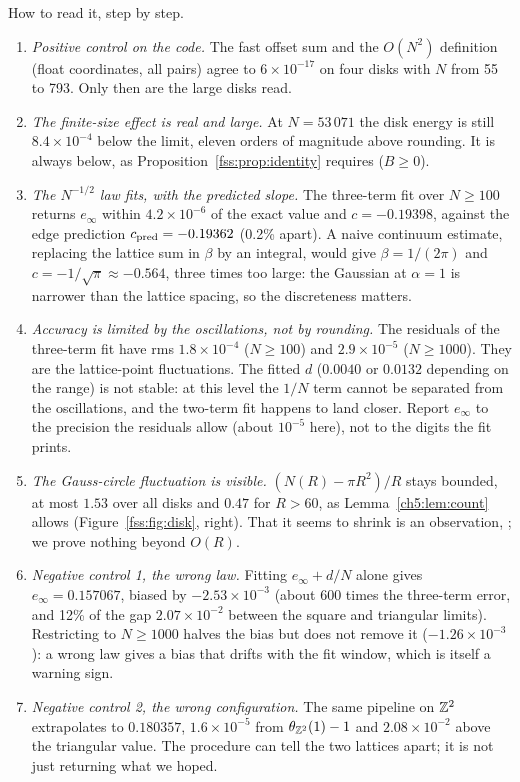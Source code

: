 How to read it, step by step.
\begin{enumerate}
\item \emph{Positive control on the code.} The fast offset sum and the $O(N^2)$ definition (float coordinates, all
pairs) agree to $6\times10^{-17}$ on four disks with $N$ from 55 to 793. Only then are the large disks read.
\item \emph{The finite-size effect is real and large.} At $N=53\,071$ the disk energy is still $8.4\times10^{-4}$ below
the limit, eleven orders of magnitude above rounding. It is always below, as Proposition~\ref{fss:prop:identity}
requires ($B\ge0$).
\item \emph{The $N^{-1/2}$ law fits, with the predicted slope.} The three-term fit over $N\ge100$ returns
$e_\infty$ within $4.2\times10^{-6}$ of the exact value and $c=-0.19398$, against the edge prediction
$c_{\rm pred}=-0.19362$ (0.2\% apart). A naive continuum estimate, replacing the lattice sum in $\beta$ by an integral,
would give $\beta=1/(2\pi)$ and $c=-1/\sqrt\pi\approx-0.564$, three times too large: the Gaussian at $\alpha=1$ is narrower
than the lattice spacing, so the discreteness matters.
\item \emph{Accuracy is limited by the oscillations, not by rounding.} The residuals of the three-term fit have rms
$1.8\times10^{-4}$ ($N\ge100$) and $2.9\times10^{-5}$ ($N\ge1000$). They are the lattice-point fluctuations. The fitted
$d$ ($0.0040$ or $0.0132$ depending on the range) is not stable: at this level the $1/N$ term cannot be separated from
the oscillations, and the two-term fit happens to land closer. Report $e_\infty$ to the precision the residuals allow
(about $10^{-5}$ here), not to the digits the fit prints.
\item \emph{The Gauss-circle fluctuation is visible.} $(N(R)-\pi R^2)/R$ stays bounded, at most $1.53$ over all disks
and $0.47$ for $R>60$, as Lemma~\ref{ch5:lem:count} allows (Figure~\ref{fss:fig:disk}, right). That it seems to shrink
is an observation, \tierX; we prove nothing beyond $O(R)$.
\item \emph{Negative control 1, the wrong law.} Fitting $e_\infty+d/N$ alone gives $e_\infty=0.157067$, biased by
$-2.53\times10^{-3}$ (about 600 times the three-term error, and 12\% of the gap $2.07\times10^{-2}$ between the square and
triangular limits). Restricting to $N\ge1000$ halves the bias but does not remove it ($-1.26\times10^{-3}$): a wrong
law gives a bias that drifts with the fit window, which is itself a warning sign.
\item \emph{Negative control 2, the wrong configuration.} The same pipeline on $\mathbb{Z}^2$ extrapolates to $0.180357$,
$1.6\times10^{-5}$ from $\theta_{\mathbb{Z}^2}(1)-1$ and $2.08\times10^{-2}$ above the triangular value. The procedure can tell
the two lattices apart; it is not just returning what we hoped.
\end{enumerate}

